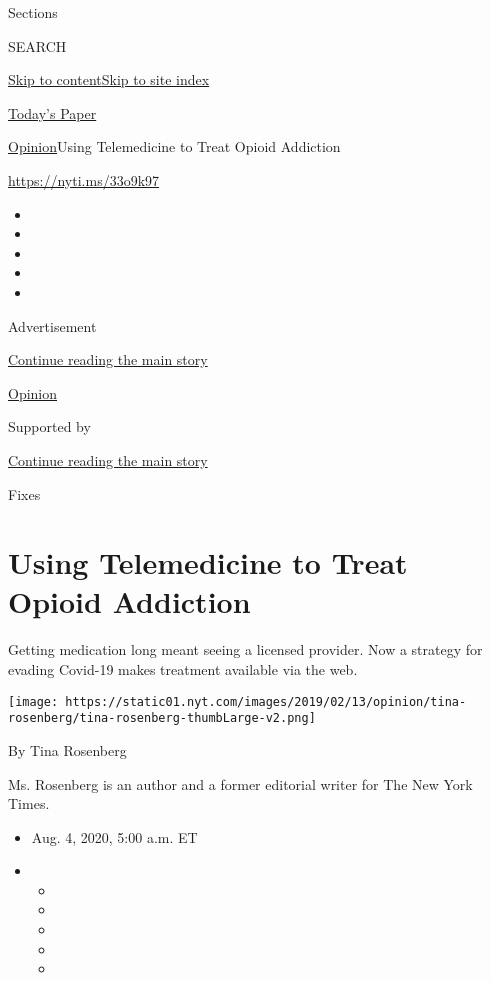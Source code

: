 Sections

SEARCH

\protect\hyperlink{site-content}{Skip to
content}\protect\hyperlink{site-index}{Skip to site index}

\href{https://myaccount.nytimes.com/auth/login?response_type=cookie\&client_id=vi}{}

\href{https://www.nytimes.com/section/todayspaper}{Today's Paper}

\href{/section/opinion}{Opinion}\textbar{}Using Telemedicine to Treat
Opioid Addiction

\url{https://nyti.ms/33o9k97}

\begin{itemize}
\item
\item
\item
\item
\item
\end{itemize}

Advertisement

\protect\hyperlink{after-top}{Continue reading the main story}

\href{/section/opinion}{Opinion}

Supported by

\protect\hyperlink{after-sponsor}{Continue reading the main story}

Fixes

\hypertarget{using-telemedicine-to-treat-opioid-addiction}{%
\section{Using Telemedicine to Treat Opioid
Addiction}\label{using-telemedicine-to-treat-opioid-addiction}}

Getting medication long meant seeing a licensed provider. Now a strategy
for evading Covid-19 makes treatment available via the web.

\texttt{[image: https://static01.nyt.com/images/2019/02/13/opinion/tina-rosenberg/tina-rosenberg-thumbLarge-v2.png]}

By Tina Rosenberg

Ms. Rosenberg is an author and a former editorial writer for The New
York Times.

\begin{itemize}
\item
  Aug. 4, 2020, 5:00 a.m. ET
\item
  \begin{itemize}
  \item
  \item
  \item
  \item
  \item
  \end{itemize}
\end{itemize}

